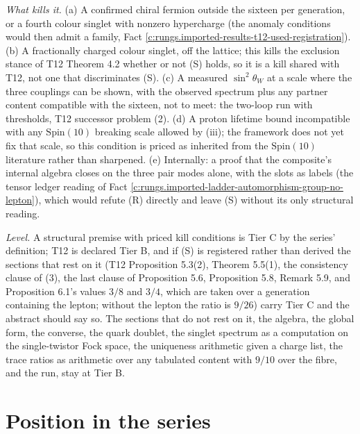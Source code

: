 \documentclass[11pt]{article}
\theoremstyle{definition}
\theoremstyle{plain}
\begin{document}
\noindent\emph{What kills it.} (a) A confirmed chiral fermion outside the sixteen per generation, or a fourth colour singlet with nonzero hypercharge (the anomaly conditions would then admit a family, Fact \ref{c:rungs.imported-results-t12-used-registration}). (b) A fractionally charged colour singlet, off the lattice; this kills the exclusion stance of T12 Theorem 4.2 whether or not (S) holds, so it is a kill shared with T12, not one that discriminates (S). (c) A measured $\sin^{2}\theta_{W}$ at a scale where the three couplings can be shown, with the observed spectrum plus any partner content compatible with the sixteen, not to meet: the two-loop run with thresholds, T12 successor problem (2). (d) A proton lifetime bound incompatible with any $\mathrm{Spin}(10)$ breaking scale allowed by (iii); the framework does not yet fix that scale, so this condition is priced as inherited from the $\mathrm{Spin}(10)$ literature rather than sharpened. (e) Internally: a proof that the composite's internal algebra closes on the three pair modes alone, with the slots as labels (the tensor ledger reading of Fact \ref{c:rungs.imported-ladder-automorphism-group-no-lepton}), which would refute (R) directly and leave (S) without its only structural reading.

\noindent\emph{Level.} A structural premise with priced kill conditions is Tier C by the series' definition; T12 is declared Tier B, and if (S) is registered rather than derived the sections that rest on it (T12 Proposition 5.3(2), Theorem 5.5(1), the consistency clause of (3), the last clause of Proposition 5.6, Proposition 5.8, Remark 5.9, and Proposition 6.1's values $3/8$ and $3/4$, which are taken over a generation containing the lepton; without the lepton the ratio is $9/26$) carry Tier C and the abstract should say so. The sections that do not rest on it, the algebra, the global form, the converse, the quark doublet, the singlet spectrum as a computation on the single-twistor Fock space, the uniqueness arithmetic given a charge list, the trace ratios as arithmetic over any tabulated content with $9/10$ over the fibre, and the run, stay at Tier B.

\section{Position in the series}
\end{document}

